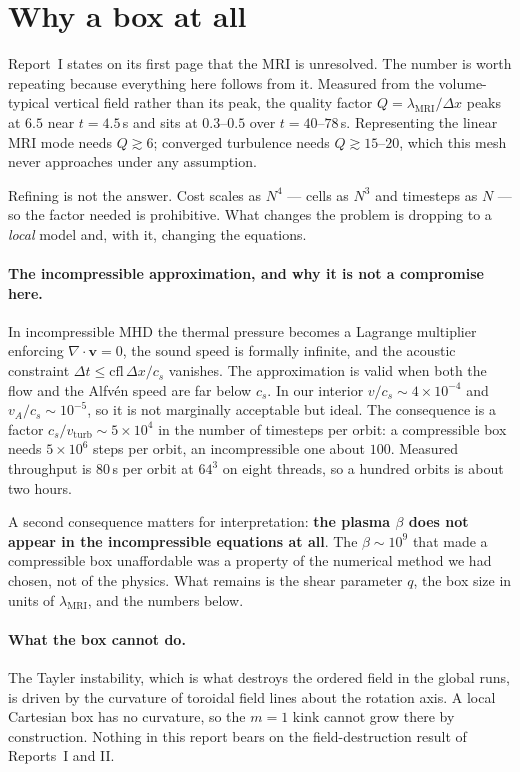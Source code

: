 \documentclass[11pt,a4paper]{article}
\newcommand{\lmri}{\lambda_{\mathrm{MRI}}}
\begin{document}
\section{Why a box at all}

Report~I states on its first page that the MRI is unresolved. The number is
worth repeating because everything here follows from it. Measured from the
volume-typical vertical field rather than its peak, the quality factor
$Q = \lmri/\Delta x$ peaks at $6.5$ near $t = 4.5$\,s and sits at $0.3$--$0.5$
over $t = 40$--$78$\,s. Representing the linear MRI mode needs $Q \gtrsim 6$;
converged turbulence needs $Q \gtrsim 15$--$20$, which this mesh never
approaches under any assumption.

Refining is not the answer. Cost scales as $N^4$ --- cells as $N^3$ and timesteps
as $N$ --- so the factor needed is prohibitive. What changes the problem is
dropping to a \emph{local} model and, with it, changing the equations.

\paragraph{The incompressible approximation, and why it is not a compromise
here.} In incompressible MHD the thermal pressure becomes a Lagrange multiplier
enforcing $\nabla\cdot\mathbf{v} = 0$, the sound speed is formally infinite, and
the acoustic constraint $\Delta t \le \mathrm{cfl}\,\Delta x/c_s$ vanishes. The
approximation is valid when both the flow and the Alfv\'en speed are far below
$c_s$. In our interior $v/c_s \sim 4\times10^{-4}$ and $v_A/c_s \sim 10^{-5}$, so
it is not marginally acceptable but ideal. The consequence is a factor
$c_s/v_{\mathrm{turb}} \sim 5\times10^4$ in the number of timesteps per orbit:
a compressible box needs $5\times10^6$ steps per orbit, an incompressible one
about $100$. Measured throughput is $80$\,s per orbit at $64^3$ on eight
threads, so a hundred orbits is about two hours.

A second consequence matters for interpretation: \textbf{the plasma $\beta$ does
not appear in the incompressible equations at all}. The $\beta \sim 10^9$ that
made a compressible box unaffordable was a property of the numerical method we
had chosen, not of the physics. What remains is the shear parameter $q$, the box
size in units of $\lmri$, and the numbers below.

\paragraph{What the box cannot do.} The Tayler instability, which is what
destroys the ordered field in the global runs, is driven by the curvature of
toroidal field lines about the rotation axis. A local Cartesian box has no
curvature, so the $m=1$ kink cannot grow there by construction. Nothing in this
report bears on the field-destruction result of Reports~I and II.
\end{document}
